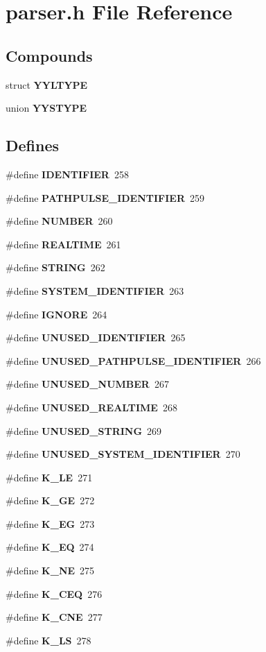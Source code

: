 \section{parser.h File Reference}
\label{parser_8h}
\subsection*{Compounds}
\begin{CompactItemize}
\item 
struct {\bf YYLTYPE}
\item 
union {\bf YYSTYPE}
\end{CompactItemize}
\subsection*{Defines}
\begin{CompactItemize}
\item 
\#define {\bf IDENTIFIER}\ 258
\item 
\#define {\bf PATHPULSE\_\-IDENTIFIER}\ 259
\item 
\#define {\bf NUMBER}\ 260
\item 
\#define {\bf REALTIME}\ 261
\item 
\#define {\bf STRING}\ 262
\item 
\#define {\bf SYSTEM\_\-IDENTIFIER}\ 263
\item 
\#define {\bf IGNORE}\ 264
\item 
\#define {\bf UNUSED\_\-IDENTIFIER}\ 265
\item 
\#define {\bf UNUSED\_\-PATHPULSE\_\-IDENTIFIER}\ 266
\item 
\#define {\bf UNUSED\_\-NUMBER}\ 267
\item 
\#define {\bf UNUSED\_\-REALTIME}\ 268
\item 
\#define {\bf UNUSED\_\-STRING}\ 269
\item 
\#define {\bf UNUSED\_\-SYSTEM\_\-IDENTIFIER}\ 270
\item 
\#define {\bf K\_\-LE}\ 271
\item 
\#define {\bf K\_\-GE}\ 272
\item 
\#define {\bf K\_\-EG}\ 273
\item 
\#define {\bf K\_\-EQ}\ 274
\item 
\#define {\bf K\_\-NE}\ 275
\item 
\#define {\bf K\_\-CEQ}\ 276
\item 
\#define {\bf K\_\-CNE}\ 277
\item 
\#define {\bf K\_\-LS}\ 278

\end{CompactItemize}
